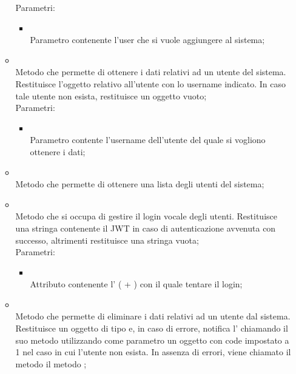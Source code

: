 \begin{itemize}
\begin{itemize}
		Parametri:
		\begin{itemize}
			\item {} \\
			Parametro contenente l'user che si vuole aggiungere al sistema;
		\end{itemize}
		\item[]  \\		Metodo che permette di ottenere i dati relativi ad un utente del sistema. Restituisce l'oggetto  relativo all'utente con lo username indicato. In caso tale utente non esista, restituisce un oggetto vuoto;\\
		Parametri:
		\begin{itemize}
			\item {} \\
			Parametro contente l'username dell'utente del quale si vogliono ottenere i dati;
		\end{itemize}
		\item[]  \\		Metodo che permette di ottenere una lista degli utenti del sistema;\\
		\item[]  \\		Metodo che si occupa di gestire il login vocale degli utenti. Restituisce una stringa contenente il JWT in caso di autenticazione avvenuta con successo, altrimenti restituisce una stringa vuota;\\
		Parametri:
		\begin{itemize}
			\item {} \\
			Attributo contenente l' ( + ) con il quale tentare il login;
		\end{itemize}
		\item[]  \\		Metodo che permette di eliminare i dati relativi ad un utente dal sistema. Restituisce un oggetto di tipo  e, in caso di errore, notifica l' chiamando il suo metodo  utilizzando come parametro un oggetto  con code impostato a 1 nel caso in cui l'utente non esista. In assenza di errori, viene chiamato il metodo il metodo ;\\

\end{itemize}
\end{itemize}
